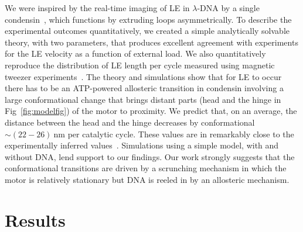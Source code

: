 \documentclass[fleqn,10pt]{wlscirep}
\newcommand{\nm}{\ \mathrm{nm}}
\begin{document}
We were inspired by the real-time imaging of LE in $\lambda$-DNA by a  single condensin~\cite{ganji2018real},  which functions by extruding loops asymmetrically. To describe the experimental outcomes quantitatively, we created a simple analytically solvable theory, with two parameters, that produces excellent agreement with experiments for the LE velocity as a function of external load. We also quantitatively reproduce the distribution of LE length per cycle measured using magnetic tweezer experiments~\cite{ryu2020resolving}. The theory and simulations show that  for LE to occur there has to be an ATP-powered  allosteric transition in condensin  involving a large  conformational change that brings distant parts (head and the hinge in Fig~\ref{fig:modelfig}) of the motor to proximity. We predict that, on an average,  the distance between the head and the hinge decreases by conformational $\sim (22- 26)\nm$ per catalytic cycle. These values are in remarkably close to  the experimentally inferred values~\cite{ganji2018real}. Simulations using a simple model, with and without DNA, lend support to our findings. Our work strongly suggests that the conformational transitions are driven by a scrunching mechanism in which the motor is relatively stationary but DNA is reeled in by an allosteric mechanism.  %


\section*{Results}

\end{document}
